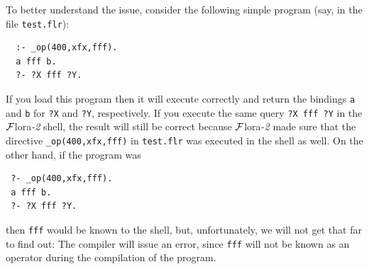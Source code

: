 \documentclass[11pt]{article}
\newcommand{\FLORA}{{\mbox{\sc ${\cal F}${lora}\rm\emph{-2}}}\xspace}
\begin{document}
To better understand the issue, consider the following simple program
(say, in the file {\tt test.flr}):
\begin{verbatim}
  :- _op(400,xfx,fff).
  a fff b.
  ?- ?X fff ?Y.
\end{verbatim}
If you load this program then it will execute correctly and return the
bindings {\tt a} and {\tt b} for {\tt ?X} and {\tt ?Y}, respectively.
If you execute the same query {\tt ?X fff ?Y} in the \FLORA shell,
the result will still be correct because \FLORA made sure that the
directive {\tt \_op(400,xfx,fff)} in
{\tt test.flr} was executed in the shell as well.
On the other hand, if the program was
\begin{verbatim}
 ?- _op(400,xfx,fff).
 a fff b.
 ?- ?X fff ?Y.
\end{verbatim}
then {\tt fff} would be known to the shell, but, unfortunately, we
will not get that far to find out: The compiler will issue an error, since
{\tt fff} will not be known as an operator during the compilation of the
program.
\end{document}
